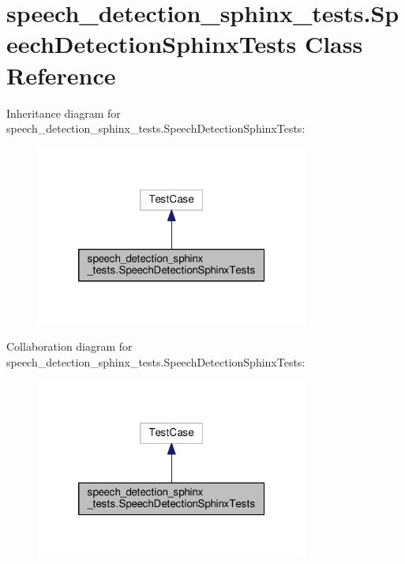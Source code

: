 \hypertarget{classspeech__detection__sphinx__tests_1_1SpeechDetectionSphinxTests}{\section{speech\-\_\-detection\-\_\-sphinx\-\_\-tests.\-Speech\-Detection\-Sphinx\-Tests Class Reference}
\label{classspeech__detection__sphinx__tests_1_1SpeechDetectionSphinxTests}
}


Inheritance diagram for speech\-\_\-detection\-\_\-sphinx\-\_\-tests.\-Speech\-Detection\-Sphinx\-Tests\-:
\nopagebreak
\begin{figure}[H]
\begin{center}
\leavevmode
\includegraphics[width=254pt]{classspeech__detection__sphinx__tests_1_1SpeechDetectionSphinxTests__inherit__graph}
\end{center}
\end{figure}


Collaboration diagram for speech\-\_\-detection\-\_\-sphinx\-\_\-tests.\-Speech\-Detection\-Sphinx\-Tests\-:
\nopagebreak
\begin{figure}[H]
\begin{center}
\leavevmode
\includegraphics[width=254pt]{classspeech__detection__sphinx__tests_1_1SpeechDetectionSphinxTests__coll__graph}
\end{center}
\end{figure}
